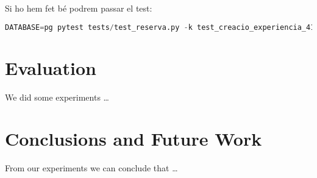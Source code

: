 \documentclass[a4paper, 11pt]{article}
\begin{document}
Si ho hem fet bé podrem passar el test:
\begin{lstlisting}[language=Python, caption=Testing 6]
  DATABASE=pg pytest tests/test_reserva.py -k test_creacio_experiencia_412
\end{lstlisting}

          

\pagebreak

\section{Evaluation}

We did some experiments \ldots

\pagebreak

\section{Conclusions and Future Work}

From our experiments we can conclude that \ldots


\end{document}
